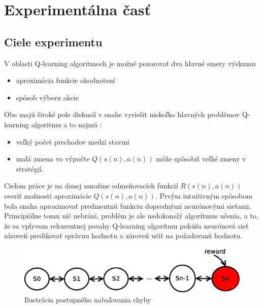 \chapter{Experimentálna časť}


\section {Ciele experimentu}

V oblasti Q-learning algoritmoch je možné pozorovať dva hlavné smery výskumu

\begin{itemize}
\item aproximácia funkcie ohodnotení \cite{bib:aproximation_01} \cite{bib:aproximation_02} \cite{bib:aproximation_03} \cite{bib:aproximation_04}
\item spôsob výberu akcie \cite{bib:strategy_01} \cite{bib:strategy_02} \cite{bib:strategy_03}
\end{itemize}

Obe majú široké pole diskusií v snahe vyriešit niekoľko hlavných problémov Q-learning
algoritmu a to najmä :

\begin{itemize}
\item veľký počet prechodov medzi stavmi
\item malá zmena vo výpočte $Q(s(n),a(n))$ môže spôsobiť veľké zmeny v stratégií.
\end{itemize}

Cieľom práce je na danej množine odmeňovacích funkcií $R(s(n), a(n))$ overiť
možnosti aproximácie $Q(s(n), a(n))$. Prvým intuitivným spôsobom bola snaha aproximovať
predmentnú funkciu doprednými neurónovými sieťami. Principiálne tomu nič nebráni,
problém je ale nedokonalý algoritmus učenia, a to, že sa vplyvom rekurentnej povahy
Q-learning algoritmu pokúša neurónová sieť zároveň predikovať správnu hodnotu
a zároveň učiť na požadovanú hodnotu.

\begin{figure}[!htb]
\center
\includegraphics[scale=.4]{../diagrams/q_chain_problem.eps}
\caption{Ilustrácia postupného nabaľovania chyby}
\label{img:snowball_problem}
\end{figure}

